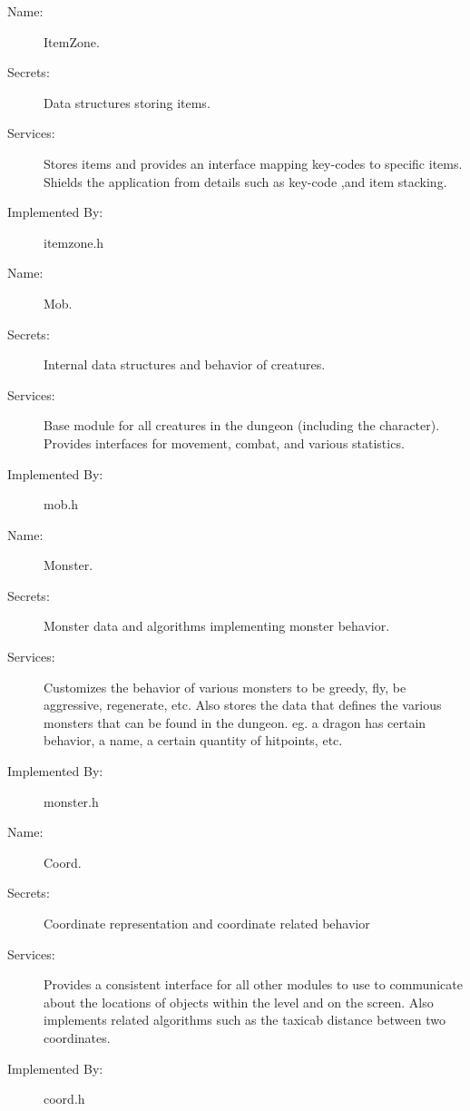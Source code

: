 \documentclass[12pt, titlepage]{article}
\begin{document}
		\bigskip\begin{description}
			\item[Name:]ItemZone.
			\item[Secrets:]Data structures storing items.
			\item[Services:]Stores items and provides an interface mapping key-codes to specific items. Shields the application from details such as key-code ,and item stacking. 
			\item[Implemented By:]itemzone.h
		\end{description}

		\bigskip\begin{description}
			\item[Name:]Mob.
			\item[Secrets:]Internal data structures and behavior of creatures.
			\item[Services:]Base module for all creatures in the dungeon (including the character). Provides interfaces for movement, combat, and various statistics.
			\item[Implemented By:]mob.h
		\end{description}

		\bigskip\begin{description}
			\item[Name:]Monster.
			\item[Secrets:]Monster data and algorithms implementing monster behavior.
			\item[Services:]Customizes the behavior of various monsters to be greedy, fly, be aggressive, regenerate, etc. Also stores the data that defines the various monsters that can be found in the dungeon. eg. a dragon has certain behavior, a name, a certain quantity of hitpoints, etc.
			\item[Implemented By:]monster.h
		\end{description}

		\bigskip\begin{description}
			\item[Name:]Coord.
			\item[Secrets:]Coordinate representation and coordinate related behavior
			\item[Services:]Provides a consistent interface for all other modules to use to communicate about the locations of objects within the level and on the screen. Also implements related algorithms such as the taxicab distance between two coordinates.
			\item[Implemented By:]coord.h
		\end{description}
\end{document}
